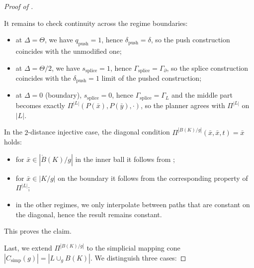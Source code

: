 \documentclass[a4paper,english,cleveref,autoref,thm-restate,nolineno]{socg-lipics-v2021}
\newcommand{\geomreal}[1] { |#1| } %
\newcommand{\conesimp}[1] { C_\mathrm{simp}(#1) } %
\begin{document}
\begin{proof}[Proof of ]
\begin{claimproof}
		It remains to check continuity across the regime boundaries:
		\begin{itemize}
			\item 		
			at $\Delta=\Theta$, we have $q_{\mathrm{push}}=1$, hence $\delta_{\mathrm{push}}=\delta$, so the push construction coincides with the unmodified one;

			\item 
			at $\Delta=\Theta/2$, we have $s_{\mathrm{splice}}=1$, hence $\Gamma_{\mathrm{splice}}=\Gamma_{\partial}$, so the splice construction coincides with the $\delta_{\mathrm{push}}=1$ limit of the pushed construction;

			\item 
			at $\Delta=0$ (boundary), $s_{\mathrm{splice}}=0$, hence $\Gamma_{\mathrm{splice}}=\Gamma_{L}$ and the middle part becomes exactly $\Pi^{\geomreal{L}}(P(\bar x),P(\bar y),\cdot)$, so the planner agrees with $\Pi^{\geomreal{L}}$ on $\geomreal{L}$.
		\end{itemize}
		
		In the $2$-distance injective case, the diagonal condition $\Pi^{\geomreal{B(K)/g}}(\bar x,\bar x,t)=\bar x$ holds: 
		\begin{itemize}
			\item 
			for $\bar x\in\geomreal{\mathring{B}(K)/g}$ in the inner ball it follows from ; 
			
			\item 
			for $\bar x\in\geomreal{K/g}$ on the boundary it follows from the corresponding property of $\Pi^{\geomreal{L}}$; 
			
			\item 
			in the other regimes, we only interpolate between paths that are constant on the diagonal, hence the result remains constant. 
		\end{itemize}
		This proves the claim.
	\end{claimproof}
	
	
	Last, we extend $\Pi^{\geomreal{B(K)/g}}$ to the simplicial mapping cone $\geomreal{\conesimp{g}}=\geomreal{L\cup_g B(K)}$.
	We distinguish three cases:
	

\end{proof}
\end{document}
